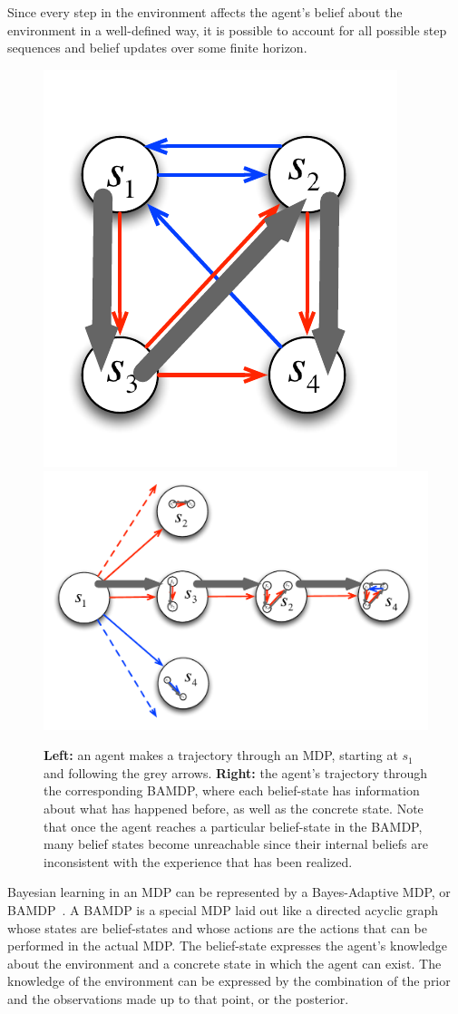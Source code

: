 Since every step in the environment affects the agent's belief about the environment in a well-defined way, it is possible to account for all possible step sequences and belief updates over some finite horizon.

\begin{figure}[t]
\begin{center}
\includegraphics[width=0.25\linewidth]{bamdp-traversal-mdp.pdf}
\includegraphics[width=0.55\linewidth]{bamdp-traversal-bamdp.pdf}
\caption{{\bf Left:} an agent makes a trajectory through an MDP, starting at $s_1$ and following the grey arrows.  {\bf Right:} the agent's trajectory through the corresponding BAMDP, where each belief-state has information about what has happened before, as well as the concrete state. Note that once the agent reaches a particular belief-state in the BAMDP, many belief states become unreachable since their internal beliefs are inconsistent with the experience that has been realized.}
\label{intro:bamdp-traversal}
\end{center}
\end{figure}

Bayesian learning in an MDP can be represented by a Bayes-Adaptive MDP, or BAMDP~\cite{duff03}. A BAMDP is a special MDP laid out like a directed acyclic graph whose states are belief-states and whose actions are the actions that can be performed in the actual MDP. The belief-state expresses the agent's knowledge about the environment and a concrete state in which the agent can exist. The knowledge of the environment can be expressed by the combination of the prior and the observations made up to that point, or the posterior.

